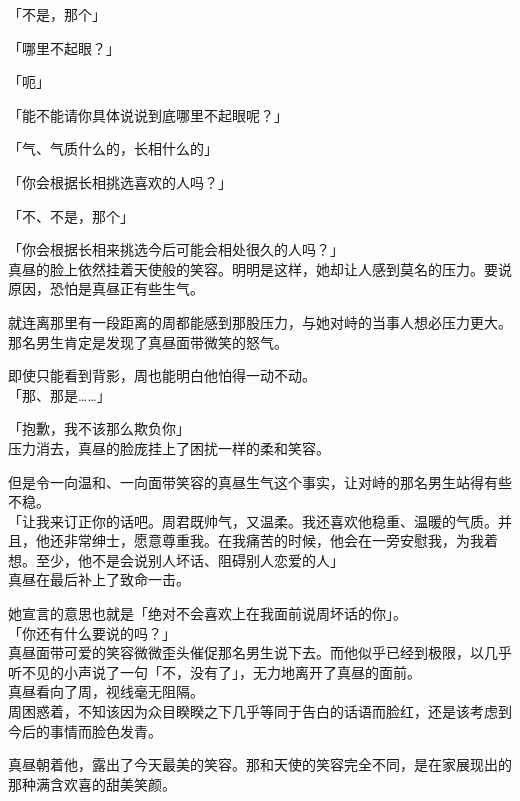「不是，那个」

「哪里不起眼？」

「呃」

「能不能请你具体说说到底哪里不起眼呢？」

「气、气质什么的，长相什么的」

「你会根据长相挑选喜欢的人吗？」

「不、不是，那个」

「你会根据长相来挑选今后可能会相处很久的人吗？」\\

真昼的脸上依然挂着天使般的笑容。明明是这样，她却让人感到莫名的压力。要说原因，恐怕是真昼正有些生气。

就连离那里有一段距离的周都能感到那股压力，与她对峙的当事人想必压力更大。\\

那名男生肯定是发现了真昼面带微笑的怒气。

即使只能看到背影，周也能明白他怕得一动不动。\\

「那、那是……」

「抱歉，我不该那么欺负你」\\

压力消去，真昼的脸庞挂上了困扰一样的柔和笑容。

但是令一向温和、一向面带笑容的真昼生气这个事实，让对峙的那名男生站得有些不稳。\\

「让我来订正你的话吧。周君既帅气，又温柔。我还喜欢他稳重、温暖的气质。并且，他还非常绅士，愿意尊重我。在我痛苦的时候，他会在一旁安慰我，为我着想。至少，他不是会说别人坏话、阻碍别人恋爱的人」\\

真昼在最后补上了致命一击。

她宣言的意思也就是「绝对不会喜欢上在我面前说周坏话的你」。\\

「你还有什么要说的吗？」\\

真昼面带可爱的笑容微微歪头催促那名男生说下去。而他似乎已经到极限，以几乎听不见的小声说了一句「不，没有了」，无力地离开了真昼的面前。\\

真昼看向了周，视线毫无阻隔。\\

周困惑着，不知该因为众目睽睽之下几乎等同于告白的话语而脸红，还是该考虑到今后的事情而脸色发青。

真昼朝着他，露出了今天最美的笑容。那和天使的笑容完全不同，是在家展现出的那种满含欢喜的甜美笑颜。\\

